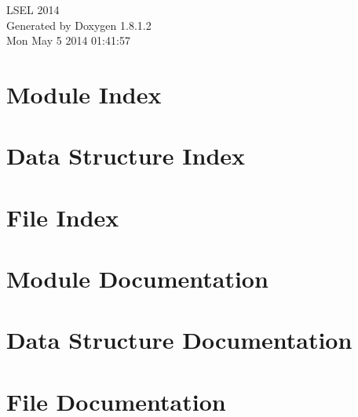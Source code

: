 \documentclass{book}
\begin{document}
\hypersetup{pageanchor=false,citecolor=blue}
\begin{titlepage}
\vspace*{7cm}
\begin{center}
{\Large L\-S\-E\-L 2014 }\\
\vspace*{1cm}
{\large Generated by Doxygen 1.8.1.2}\\
\vspace*{0.5cm}
{\small Mon May 5 2014 01:41:57}\\
\end{center}
\end{titlepage}
\clearemptydoublepage
{}
\tableofcontents
\clearemptydoublepage
{}
\hypersetup{pageanchor=true,citecolor=blue}
\chapter{Module Index}

\chapter{Data Structure Index}

\chapter{File Index}

\chapter{Module Documentation}






















\chapter{Data Structure Documentation}



























\chapter{File Documentation}









\printindex
\end{document}
